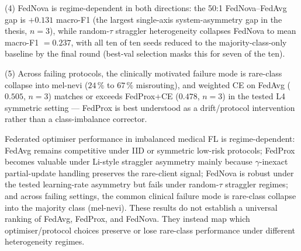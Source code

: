 \documentclass[11pt,a4paper]{report}
\begin{document}
(4) FedNova is regime-dependent in both directions: the 50:1 FedNova--FedAvg
gap is $+0.131$ macro-F1 (the largest single-axis system-asymmetry gap in
the thesis, $n=3$), while random-$\tau$ straggler heterogeneity collapses
FedNova to mean macro-F1 $= 0.237$, with all ten of ten seeds reduced to
the majority-class-only baseline by the final round (best-val selection
masks this for seven of the ten).

(5) Across failing protocols, the clinically motivated failure mode is
rare-class collapse into mel-nevi ($24\,\%$ to $67\,\%$ misrouting), and
weighted CE on FedAvg ($0.505$, $n=3$) matches or exceeds FedProx+CE
($0.478$, $n=3$) in the tested L4 symmetric setting --- FedProx is best
understood as a drift/protocol intervention rather than a class-imbalance
corrector.

Federated optimiser performance in imbalanced medical FL is regime-dependent:
FedAvg remains competitive under IID or symmetric low-risk protocols;
FedProx becomes valuable under Li-style straggler asymmetry mainly because
$\gamma$-inexact partial-update handling preserves the rare-client signal;
FedNova is robust under the tested learning-rate asymmetry but fails under
random-$\tau$ straggler regimes; and across failing settings, the common
clinical failure mode is rare-class collapse into the majority class
(mel-nevi). These results do not establish a universal ranking of FedAvg,
FedProx, and FedNova. They instead map which optimiser/protocol choices
preserve or lose rare-class performance under different heterogeneity
regimes.


\end{document}
